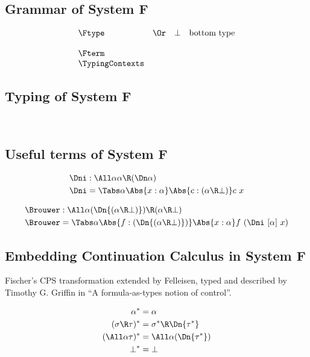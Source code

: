 \documentclass{amsart}
\begin{document}
\subsection{Grammar of System F}

\[
\begin{array}{lclr}
\Ftype
&\Or& \bot & \mbox{bottom type} \\
\\
\Fterm
\\
\TypingContexts
\end{array}
\]

\subsection{Typing of System F}
~

\FRules

\subsection{Useful terms of System F}
\label{sec:f-terms}

\begin{align*}
\Dni & : \All\alpha \alpha \R (\Dn\alpha) \\
\Dni & = \Tabs\alpha \Abs{x:\alpha}
           \Abs{c : (\alpha \R \bot)} c~x
\end{align*}

\begin{align*}
\Brouwer & : \All\alpha (\Dn{(\alpha\R\bot)}) \R (\alpha \R \bot) \\
\Brouwer & = \Tabs\alpha \Abs{f:(\Dn{(\alpha\R\bot)})}
           \Abs{x:\alpha} f~(\Dni~[\alpha]~x)
\end{align*}

\subsection{Embedding Continuation Calculus in System F}
\label{sec:cps}

Fischer's CPS transformation extended by Felleisen, typed and
described by Timothy G. Griffin in ``A formula-as-types notion of
control''.

\begin{align*}
\alpha^* & =
  \alpha
  \\
(\sigma \R \tau)^* & =
  \sigma^* \R \Dn{\tau^*}
  \\
(\All\alpha\tau)^* & =
  \All\alpha (\Dn{\tau^*})
  \\
\bot^* & =
  \bot
\end{align*}
\end{document}
